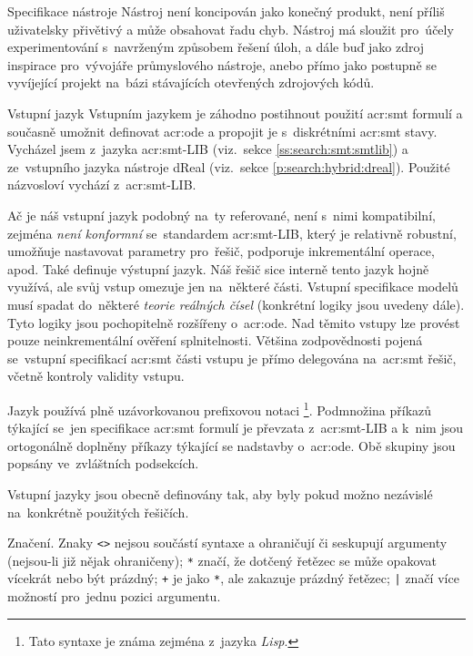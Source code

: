 \documentclass[thesis=M,czech]{FITthesis}[2012/06/26]
\newcommand{\acrlabel}[1]{acr:#1}
\newcommand{\acr}[1]{\acrshort{\acrlabel{#1}}}
\newcommand{\id}[1]{\texttt{#1}}
\newcommand{\hl}[1]{\textit{#1}}
\newcommand{\name}[1]{\hl{#1}}
\newcommand{\rf}[1]{\ref{#1}}
\begin{document}
\begin{section}{Specifikace nástroje}
Nástroj není koncipován jako konečný produkt,
není příliš uživatelsky přivětivý
a může obsahovat řadu chyb.
Nástroj má sloužit pro~účely experimentování
s~navrženým způsobem řešení úloh,
a dále buď jako zdroj inspirace
pro~vývojáře průmyslového nástroje,
anebo přímo jako postupně se vyvíjející projekt
na~bázi stávajících otevřených zdrojových kódů.


\begin{subsection}{Vstupní jazyk}\label{ss:design:spec:ilang}
Vstupním jazykem je záhodno postihnout
použití \acr{smt} formulí
a současně umožnit definovat \acr{ode}
a propojit je s~diskrétními \acr{smt} stavy.
Vycházel jsem z~jazyka \acr{smt}-LIB
(viz.~sekce \rf{ss:search:smt:smtlib})
a ze~vstupního jazyka nástroje dReal
(viz.~sekce \rf{p:search:hybrid:dreal}).
Použité názvosloví vychází z~\acr{smt}-LIB.

Ač je náš vstupní jazyk podobný na~ty referované,
není s~nimi kompatibilní,
zejména \hl{není konformní} se~standardem \acr{smt}-LIB,
který je relativně robustní,
umožňuje nastavovat parametry pro~řešič,
podporuje inkrementální operace, apod.
Také definuje výstupní jazyk.
Náš řešič sice interně tento jazyk hojně využívá,
ale svůj vstup omezuje jen na~některé části.
Vstupní specifikace modelů musí
spadat do~některé \hl{teorie reálných čísel}
(konkrétní logiky jsou uvedeny dále).
Tyto logiky jsou pochopitelně rozšířeny o~\acr{ode}.
Nad těmito vstupy lze provést pouze neinkrementální ověření splnitelnosti.
Většina zodpovědnosti pojená se~vstupní specifikací
\acr{smt} části vstupu je přímo delegována
na~\acr{smt} řešič, včetně kontroly validity vstupu.

Jazyk používá plně uzávorkovanou prefixovou notaci%
\footnote{Tato syntaxe je známa zejména z~jazyka \name{Lisp}.}.
Podmnožina příkazů týkající se~jen specifikace \acr{smt} formulí
je převzata z~\acr{smt}-LIB
a k~nim jsou ortogonálně doplněny
příkazy týkající se nadstavby o~\acr{ode}.
Obě skupiny jsou popsány ve~zvláštních podsekcích.

Vstupní jazyky jsou obecně definovány tak,
aby byly pokud možno nezávislé na~konkrétně použitých řešičích.


\begin{paragraph}{Značení.}\label{ss:design:spec:ilang:sign}
Znaky \id{<>} nejsou součástí syntaxe a ohraničují či seskupují argumenty
(nejsou-li již nějak ohraničeny);
\id{*} značí, že dotčený řetězec
se může opakovat vícekrát nebo být prázdný;
\id{+} je jako \id{*}, ale zakazuje prázdný řetězec;
\id{|} značí více možností pro~jednu pozici argumentu.
\end{paragraph} %


\end{subsection}
\end{section}
\end{document}
